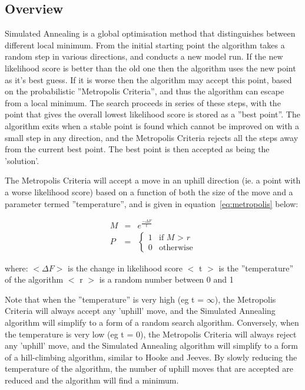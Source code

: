 \documentclass [a4paper, 10pt]{book}
\begin{document}
\subsection{Overview}\label{subsec:simannover}
Simulated Annealing is a global optimisation method that distinguishes between different local minimum.  From the initial starting point the algorithm takes a random step in various directions, and conducts a new model run.  If the new likelihood score is better than the old one then the algorithm uses the new point as it's best guess.  If it is worse then the algorithm may accept this point, based on the probabilistic ''Metropolis Criteria'', and thus the algorithm can escape from a local minimum.  The search proceeds in series of these steps, with the point that gives the overall lowest likelihood score is stored as a ''best point''.  The algorithm exits when a stable point is found which cannot be improved on with a small step in any direction, and the Metropolis Criteria rejects all the steps away from the current best point.  The best point is then accepted as being the 'solution'.

\bigskip
The Metropolis Criteria will accept a move in an uphill direction (ie. a point with a worse likelihood score) based on a function of both the size of the move and a parameter termed ''temperature'', and is given in equation~\ref{eq:metropolis} below:

\begin{eqnarray}\label{eq:metropolis}
M & = & e^{\displaystyle \frac{-\Delta F} {t}} \nonumber \\
P & = & 
\begin{cases}
1 & \textrm{if $M$ > $r$}\\
0 & \textrm{otherwise}
\end{cases}
\end{eqnarray}

where:\newline
$<\Delta F>$ is the change in likelihood score\newline
$<$ t $>$ is the ''temperature'' of the algorithm\newline
$<$ r $>$ is a random number between 0 and 1

\bigskip
Note that when the ''temperature'' is very high (eg t = $\infty$), the Metropolis Criteria will always accept any 'uphill' move, and the Simulated Annealing algorithm will simplify to a form of a random search algorithm.  Conversely, when the temperature is very low (eg t = 0), the Metropolis Criteria will always reject any 'uphill' move, and the Simulated Annealing algorithm will simplify to a form of a hill-climbing algorithm, similar to Hooke and Jeeves.  By slowly reducing the temperature of the algorithm, the number of uphill moves that are accepted are reduced and the algorithm will find a minimum.
\end{document}
